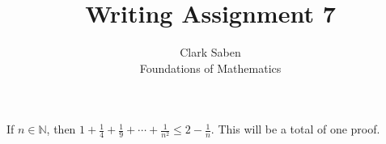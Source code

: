 \documentclass[12pt]{article}
\newenvironment{theorem}[2][Theorem]{\begin{trivlist}
\item[\hskip \labelsep {\bfseries #1}\hskip \labelsep {\bfseries #2.}]}{\end{trivlist}}
\begin{document}
 
 
\title{Writing Assignment 7}%
\author{Clark Saben\\ %
Foundations of Mathematics} %
 
\maketitle

\begin{theorem}{WA 7.1}
	If $n \in \mathbb{N}$, then $1+\frac{1}{4}+\frac{1}{9}+\cdots+\frac{1}{n^2} \leq 2-\frac{1}{n}$. This will be a total of one proof.
\end{theorem}
\end{document}
